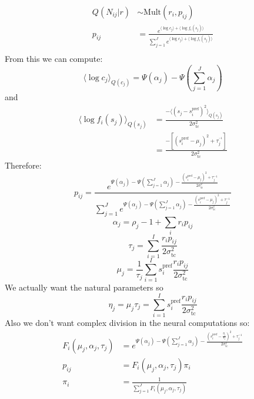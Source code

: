 \documentclass[12pt]{article}
\begin{document}
\begin{equation}
\begin{aligned}
Q(N_{ij}|r) &\sim \text{Mult}(r_i, p_{ij})\\
p_{ij} &= \frac{e^{\langle \log c_j \rangle + \langle \log f_i(s_j) \rangle}}{\sum_{j=1}^J e^{\langle \log c_j \rangle + \langle \log f_i(s_j) \rangle}}\\
\end{aligned}
\end{equation}
From this we can compute:
\begin{equation}
\langle \log c_j \rangle_{Q(c_j)}= \Psi(\alpha_j) - \Psi(\sum_{j=1}^J \alpha_j)
\end{equation}
and
\begin{equation}
\begin{aligned}
\langle \log f_i(s_j) \rangle_{Q(s_j)} &= \frac{-\langle (s_j - s_i^{\text{pref}})^2 \rangle_{Q(s_j)}}{2 \sigma_{\text{tc}}^2}\\
&=  \frac{-[(s_i^{\text{pref}} - \mu_j)^2 + \tau_j^{^{-1}}]}{2 \sigma_{\text{tc}}^2}
\end{aligned}
\end{equation}
Therefore: 
\begin{equation}
p_{ij} = \frac{e^{\Psi(\alpha_j) - \Psi(\sum_{j=1}^J \alpha_j) - \frac{(s_i^{\text{pref}} - \mu_j)^2 + \tau_j^{-1}}{2 \sigma_{\text{tc}}^2}}}{\sum_{j=1}^J e^{\Psi(\alpha_j) - \Psi(\sum_{j=1}^J \alpha_j) - \frac{(s_i^{\text{pref}} - \mu_j)^2 + \tau_j^{-1}}{2 \sigma_{\text{tc}}^2}}}
\end{equation}
\begin{equation}
\alpha_j = \rho_j - 1 + \sum_i r_i p_{ij}
\end{equation}
\begin{equation}
\tau_j = \sum_{i=1}^I \frac{r_i p_{ij}}{2 \sigma_{\text{tc}}^2}
\end{equation}
\begin{equation}
\mu_j = \frac{1}{\tau_j} \sum_{i=1}^I s_i^{\text{pref}} \frac{r_i p_{ij}}{2 \sigma_{\text{tc}}^2}
\end{equation}
We actually want the natural parameters so 
\begin{equation}
\eta_j = \mu_j \tau_j = \sum_{i=1}^I s_i^{\text{pref}} \frac{r_i p_{ij}}{2 \sigma_{\text{tc}}^2}
\end{equation}
Also we don't want complex division in the neural computations so:
\begin{equation}
\begin{aligned}
F_i(\mu_j, \alpha_j, \tau_j) &= e^{\Psi(\alpha_j) - \Psi(\sum_{j=1}^J \alpha_j) - \frac{(s_i^{\text{pref}} - \frac{\eta_j}{\tau_j})^2 + \tau_j^{-1}}{2 \sigma_{\text{tc}}^2}}\\
p_{ij} &= F_i(\mu_j, \alpha_j, \tau_j) \pi_i\\
\pi_i &= \frac{1}{\sum_{j=1}^J F_i(\mu_j, \alpha_j, \tau_j)}
\end{aligned}
\end{equation}
\end{document}
